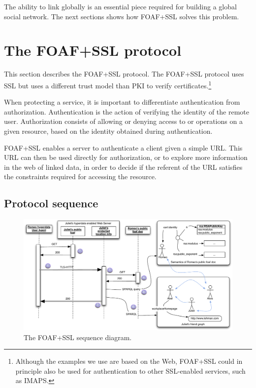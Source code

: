 \documentclass{llncs}
\begin{document}
The ability to link globally is an essential piece required for building a global
social network.  The next sections shows how FOAF+SSL solves this problem.

\section{The FOAF+SSL protocol}
\label{sec:foaftlsprotocol}

This section describes the FOAF+SSL protocol.  The FOAF+SSL protocol
uses SSL but uses a different trust model than PKI to verify
certificates.\footnote{Although the examples we use are based on the
  Web, FOAF+SSL could in principle also be used for authentication to
  other SSL-enabled services, such as IMAPS.}

When protecting a service, it is important to differentiate
authentication from authorization.  Authentication is the action of
verifying the identity of the remote user.  Authorization consists of
allowing or denying access to or operations on a given resource, based
on the identity obtained during authentication.

FOAF+SSL enables a server to authenticate a client given a simple
URL. This URL can then be used directly for authorization, or to
explore more information in the web of linked data, in order to decide
if the referent of the URL satisfies the constraints required for
accessing the resource.

\subsection{Protocol sequence}
\label{sec:foafsslprotseq}

\begin{figure}[htbp]
\centering\includegraphics[width=\columnwidth]{figures/foaf_ssl_sequence}
\caption{The FOAF+SSL sequence diagram.}
\label{fig:foafsslseqdiag}
\end{figure}
\end{document}

